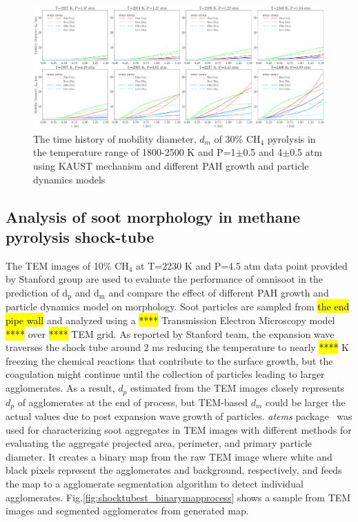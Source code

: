 \begin{figure}[H]
	\centering
	\includegraphics[width=1\textwidth]{Figures/Results/Shocktube/Stanford/September/stsh_cases_dm.pdf}
	\caption{The time history of mobility diameter, $d_m$ of 30\% $\mathrm{CH_4}$ pyrolysis in the temperature range of 1800-2500 K and P=1$\pm$0.5 and 4$\pm$0.5 atm using KAUST mechanism and different PAH growth and particle dynamics models}
	\label{fig:shocktubest_sepcasedm} 
\end{figure}

\subsection{Analysis of soot morphology in methane pyrolysis shock-tube}

The TEM images of 10\% $\mathrm{CH_4}$ at T=2230 K and P=4.5 atm data point provided by Stanford group are used to evaluate the performance of omnisoot in the prediction of $\mathrm{d_p}$ and $\mathrm{d_m}$ and compare the effect of different PAH growth and particle dynamics model on morphology. Soot particles are sampled from \hl{the end pipe wall} and analyzed using a \hl{****} Transmission Electron Microscopy model \hl{****} over \hl{****} TEM grid. As reported by Stanford team, the expansion wave traverses the shock tube around 2 ms reducing the temperature to nearly \hl{****} K freezing the chemical reactions that contribute to the surface growth, but the coagulation might continue until the collection of particles leading to larger agglomerates. As a result, $d_p$ estimated from the TEM images closely represents $d_p$ of agglomerates at the end of process, but TEM-based $d_m$ could be larger the actual values due to post expansion wave growth of particles. \textit{atems} package~\citep{sipkens2021using} was used for characterizing soot aggregates in TEM images with different methods for evaluating the aggregate projected area, perimeter, and primary particle diameter. It creates a binary map from the raw TEM image where white and black pixels represent the agglomerates and background, respectively, and feeds the map to a agglomerate segmentation algorithm to detect individual agglomerates. Fig.\ref{fig:shocktubest_binarymapprocess} shows a sample from TEM images and segmented agglomerates from generated map.

